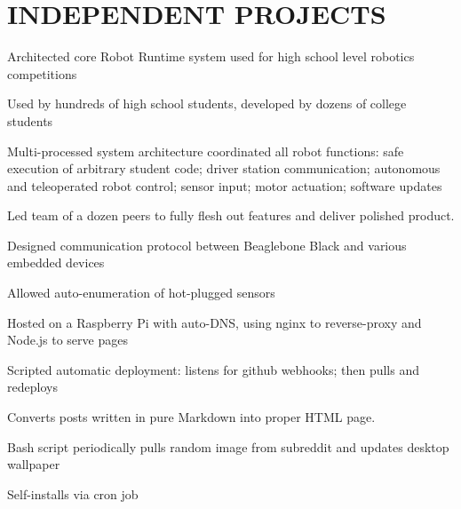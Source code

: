 \documentclass[]{resume}
\begin{document}
\begin{minipage}[t]{0.66\textwidth}
\section{INDEPENDENT PROJECTS}

\begin{tightemize}
\item Architected core Robot Runtime system used for high school level robotics competitions
\item Used by hundreds of high school students, developed by dozens of college students
\item Multi-processed system architecture coordinated all robot functions: safe execution of arbitrary student code; driver station communication; autonomous and teleoperated robot control; sensor input; motor actuation; software updates
\item Led team of a dozen peers to fully flesh out features and deliver polished product.
\item Designed communication protocol between Beaglebone Black and various embedded devices
\item Allowed auto-enumeration of hot-plugged sensors
\end{tightemize}
\sectionsep

\begin{tightemize}
\item Hosted on a Raspberry Pi with auto-DNS, using nginx to reverse-proxy and Node.js to serve pages
\item Scripted automatic deployment: listens for github webhooks; then pulls and redeploys
\item Converts posts written in pure Markdown into proper HTML page.
\end{tightemize}
\sectionsep

\begin{tightemize}
\item Bash script periodically pulls random image from subreddit and updates desktop wallpaper
\item Self-installs via cron job
\end{tightemize}
\sectionsep


\end{minipage} 
\end{document}
